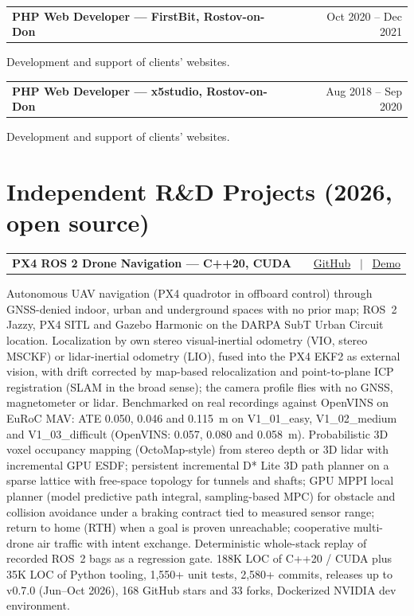 \documentclass[a4paper,11pt]{article}
\makeatletter
\newenvironment{jobshort}[2]
    {
    \begin{tabularx}{\linewidth}{@{}l X r@{}}
    \textbf{#1} & \hfill &  #2 \\[3.75pt]
    \end{tabularx}
    }
    {
    }
\makeatother
\begin{document}
\vspace{6pt}
\begin{jobshort}{PHP Web Developer --- FirstBit, Rostov-on-Don}{Oct 2020 -- Dec 2021}
Development and support of clients' websites.
\end{jobshort}

\begin{jobshort}{PHP Web Developer --- x5studio, Rostov-on-Don}{Aug 2018 -- Sep 2020}
Development and support of clients' websites.
\end{jobshort}

\section{Independent R\&D Projects (2026, open source)}

\begin{jobshort}{\textbf{PX4 ROS 2 Drone Navigation} --- C++20, CUDA}{\href{https://github.com/formiat/px4-ros2-drone-nav}{GitHub} \ $|$ \ \href{https://www.youtube.com/watch?v=OUuAj2WNKzs}{Demo}}
Autonomous UAV navigation (PX4 quadrotor in offboard control) through GNSS-denied indoor, urban and underground spaces with no prior map; ROS~2 Jazzy, PX4 SITL and Gazebo Harmonic on the DARPA SubT Urban Circuit location. Localization by own stereo visual-inertial odometry (VIO, stereo MSCKF) or lidar-inertial odometry (LIO), fused into the PX4 EKF2 as external vision, with drift corrected by map-based relocalization and point-to-plane ICP registration (SLAM in the broad sense); the camera profile flies with no GNSS, magnetometer or lidar. Benchmarked on real recordings against OpenVINS on EuRoC MAV: ATE 0.050, 0.046 and 0.115~m on V1\_01\_easy, V1\_02\_medium and V1\_03\_difficult (OpenVINS: 0.057, 0.080 and 0.058~m). Probabilistic 3D voxel occupancy mapping (OctoMap-style) from stereo depth or 3D lidar with incremental GPU ESDF; persistent incremental D* Lite 3D path planner on a sparse lattice with free-space topology for tunnels and shafts; GPU MPPI local planner (model predictive path integral, sampling-based MPC) for obstacle and collision avoidance under a braking contract tied to measured sensor range; return to home (RTH) when a goal is proven unreachable; cooperative multi-drone air traffic with intent exchange. Deterministic whole-stack replay of recorded ROS~2 bags as a regression gate. 188K LOC of C++20 / CUDA plus 35K LOC of Python tooling, 1,550+ unit tests, 2,580+ commits, releases up to v0.7.0 (Jun--Oct 2026), 168 GitHub stars and 33 forks, Dockerized NVIDIA dev environment.
\end{jobshort}
\end{document}

